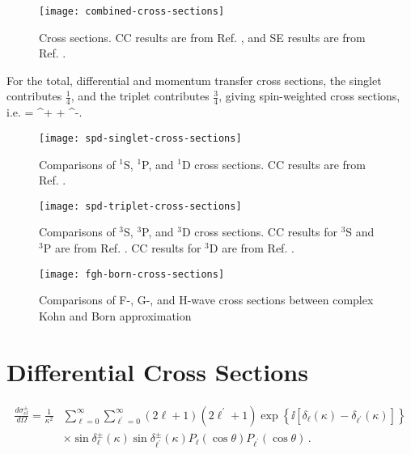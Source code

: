 \documentclass[Dissertation.tex]{subfiles}
\begin{document}
\begin{figure}[H]
	\centering
	\texttt{[image: combined-cross-sections]}
	\caption[Cross sections.]{Cross sections. CC results are from Ref. \cite{Walters2004}, and SE results are from Ref. \cite{Hara1975}.}
	\label{fig:combined-cross-sections}
\end{figure}


For the total, differential and momentum transfer cross sections, the singlet contributes $\frac{1}{4}$, and the triplet contributes $\frac{3}{4}$, giving spin-weighted cross sections, i.e. \cite{Ward1987}
\beq
\label{eq:SpinWeightCS}
\sigma =  \sigma^+ +  \sigma^-.
\eeq


\label{sec:crosscompare}
\begin{figure}[H]
	\centering
	\texttt{[image: spd-singlet-cross-sections]}
	\caption[Comparisons of $^1$S, $^1$P, and $^1$D cross sections.]{Comparisons of $^1$S, $^1$P, and $^1$D cross sections. CC results are from Ref. \cite{Walters2004}.}
	\label{fig:spd-singlet-cross-sections}
\end{figure}

\begin{figure}[H]
	\centering
	\texttt{[image: spd-triplet-cross-sections]}
	\caption[Comparisons of $^3$S, $^3$P, and $^3$D cross sections.]{Comparisons of $^3$S, $^3$P, and $^3$D cross sections. CC results for $^3$S and $^3$P are from Ref. \cite{Walters2004}. CC results for $^3$D are from Ref. \cite{Blackwood2002}.}
	\label{fig:spd-triplet-cross-sections}
\end{figure}


\begin{figure}[H]
	\centering
	\texttt{[image: fgh-born-cross-sections]}
	\caption[Comparisons of F-, G-, and H-wave cross sections]{Comparisons of F-, G-, and H-wave cross sections between complex Kohn and Born approximation}
	\label{fig:fgh-born-cross-sections}
\end{figure}


\section{Differential Cross Sections}
\label{sec:diffcross}


\begin{align}
\label{eq:DiffCross}
\nonumber \frac{d\sigma_{el}^\pm}{d\Omega} = \frac{1}{\kappa^2} & \sum_{\ell=0}^\infty \sum_{\ell^\prime=0}^\infty (2\ell+1)(2\ell^\prime+1) \exp\left\{\ii \left[\delta_\ell(\kappa) - \delta_{\ell^\prime}(\kappa) \right] \right\} \\
& \times \sin\delta_\ell^\pm(\kappa) \sin\delta_{\ell^\prime}^\pm(\kappa) P_\ell(\cos\theta) P_{\ell^\prime}(\cos\theta)\,.
\end{align}
\end{document}
